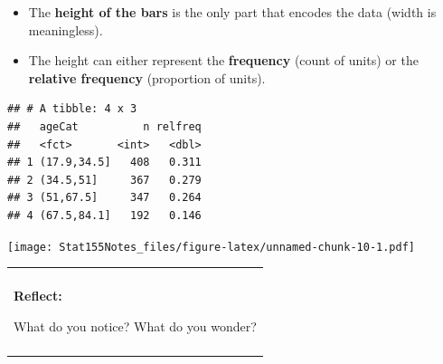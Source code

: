\documentclass[]{book}
\newenvironment{Shaded}{\begin{snugshade}}{\end{snugshade}}
\newcommand{\CommentTok}[1]{\textcolor[rgb]{0.56,0.35,0.01}{\textit{#1}}}
\newcommand{\DataTypeTok}[1]{\textcolor[rgb]{0.13,0.29,0.53}{#1}}
\newcommand{\KeywordTok}[1]{\textcolor[rgb]{0.13,0.29,0.53}{\textbf{#1}}}
\newcommand{\NormalTok}[1]{#1}
\newcommand{\OperatorTok}[1]{\textcolor[rgb]{0.81,0.36,0.00}{\textbf{#1}}}
\newcommand{\StringTok}[1]{\textcolor[rgb]{0.31,0.60,0.02}{#1}}
\providecommand{\tightlist}{%
  \setlength{\itemsep}{0pt}\setlength{\parskip}{0pt}}
\newenvironment{reflect}
{
    \begin{center}
    
    \begin{tabular}{|p{0.8\textwidth}|}
    \rowcolor{LightBlue}
    \hline\\
    \rowcolor{LightBlue}
    \textbf{Reflect:}
}
{
    \\\rowcolor{LightBlue}
    \\\hline
    \end{tabular} 
    \end{center}
}
\begin{document}
\begin{itemize}
\tightlist
\item
  The \textbf{height of the bars} is the only part that encodes the data (width is meaningless).
\item
  The height can either represent the \textbf{frequency} (count of units) or the \textbf{relative frequency} (proportion of units).
\end{itemize}

\begin{Shaded}
\end{Shaded}

\begin{verbatim}
## # A tibble: 4 x 3
##   ageCat          n relfreq
##   <fct>       <int>   <dbl>
## 1 (17.9,34.5]   408   0.311
## 2 (34.5,51]     367   0.279
## 3 (51,67.5]     347   0.264
## 4 (67.5,84.1]   192   0.146
\end{verbatim}

\begin{Shaded}
\end{Shaded}

\texttt{[image: Stat155Notes\_files/figure-latex/unnamed-chunk-10-1.pdf]}

\begin{reflect}
What do you notice? What do you wonder?
\end{reflect}
\end{document}
